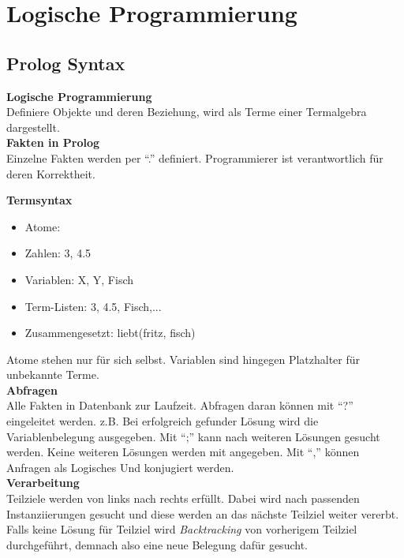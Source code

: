 

\lstset{language=Prolog,mathescape=true}

\section{Logische Programmierung}

\subsection{Prolog Syntax}
\textbf{Logische Programmierung}\\
Definiere Objekte und deren Beziehung, wird als Terme einer Termalgebra dargestellt.\\

\textbf{Fakten in Prolog}\\
Einzelne Fakten werden per \enquote{.} definiert.
Programmierer ist verantwortlich für deren Korrektheit.

\textbf{Termsyntax}
\begin{itemize}
  \item Atome: 
  \item Zahlen: 3, 4.5
  \item Variablen: X, Y, Fisch
  \item Term-Listen: 3, 4.5, Fisch,...
  \item Zusammengesetzt: liebt(fritz, fisch)
\end{itemize}
Atome stehen nur für sich selbst. Variablen sind hingegen Platzhalter für unbekannte Terme.\\

\textbf{Abfragen}\\
Alle Fakten in Datenbank zur Laufzeit. Abfragen daran können mit \enquote{?} eingeleitet werden.
z.B. 
Bei erfolgreich gefunder Lösung wird die Variablenbelegung ausgegeben. Mit \enquote{;} kann nach weiteren Lösungen
gesucht werden. Keine weiteren Lösungen werden mit  angegeben.
Mit \enquote{,} können Anfragen als Logisches Und konjugiert werden.\\

\textbf{Verarbeitung}\\
Teilziele werden von links nach rechts erfüllt. Dabei wird nach passenden Instanziierungen gesucht und diese werden
an das nächste Teilziel weiter vererbt. Falls keine Lösung für Teilziel wird \textit{Backtracking} von vorherigem Teilziel
durchgeführt, demnach also eine neue Belegung dafür gesucht.\\

